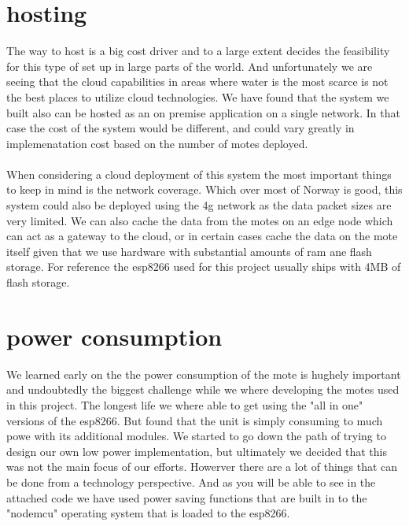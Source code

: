 \documentclass[]{uiophd}
\begin{document}
\section{hosting}
The way to host is a big cost driver and to a large extent decides the feasibility for this type of set up in large parts of the world. And unfortunately we are seeing that the cloud capabilities in areas where water is the most scarce is not the best places to utilize cloud technologies. We have found that the system we built also can be hosted as an on premise application on a single network. In that case the cost of the system would be different, and could vary greatly in implemenatation cost based on the number of motes deployed.
\\\\
When considering a cloud deployment of this system the most important things to keep in mind is the network coverage. Which over most of Norway is good, this system could also be deployed using the 4g network as the data packet sizes are very limited. We can also cache the data from the motes on an edge node which can act as a gateway to the cloud, or in certain cases cache the data on the mote itself given that we use hardware with substantial amounts of ram ane flash storage. For reference the esp8266 used for this project usually ships with 4MB of flash storage. 
\section{power consumption}
We learned early on the the power consumption of the mote is hughely important and undoubtedly the biggest challenge while we where developing the motes used in this project. The longest life we where able to get using the "all in one" versions of the esp8266. But found that the unit is simply consuming to much powe with its additional modules. We started to go down the path of trying to design our own low power implementation, but ultimately we decided that this was not the main focus of our efforts. Howerver there are a lot of things that can be done from a technology perspective. And as you will be able to see in the attached code we have used  power saving functions that are built in to the "nodemcu" operating system that is loaded to the esp8266.
\end{document}
